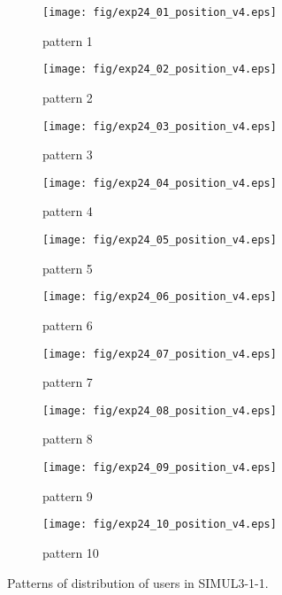 \begin{figure}
	\begin{center}
		\begin{subfigure}[b]{0.32\textwidth}
			\texttt{[image: fig/exp24\_01\_position\_v4.eps]}
			\caption{pattern 1}
			\label{figure:simul3_1_1_a}
		\end{subfigure}
		\begin{subfigure}[b]{0.32\textwidth}
			\texttt{[image: fig/exp24\_02\_position\_v4.eps]}
			\caption{pattern 2}
			\label{figure:simul3_1_1_b}
		\end{subfigure}
		\begin{subfigure}[b]{0.32\textwidth}
			\texttt{[image: fig/exp24\_03\_position\_v4.eps]}
			\caption{pattern 3}
			\label{figure:simul3_1_1_c}
		\end{subfigure}
		\begin{subfigure}[b]{0.32\textwidth}
			\texttt{[image: fig/exp24\_04\_position\_v4.eps]}
			\caption{pattern 4}
			\label{figure:simul3_1_1_d}
		\end{subfigure}
		\begin{subfigure}[b]{0.32\textwidth}
			\texttt{[image: fig/exp24\_05\_position\_v4.eps]}
			\caption{pattern 5}
			\label{figure:simul3_1_1_e}
		\end{subfigure}
		\begin{subfigure}[b]{0.32\textwidth}
			\texttt{[image: fig/exp24\_06\_position\_v4.eps]}
			\caption{pattern 6}
			\label{figure:simul3_1_1_f}
		\end{subfigure}
		\begin{subfigure}[b]{0.32\textwidth}
			\texttt{[image: fig/exp24\_07\_position\_v4.eps]}
			\caption{pattern 7}
			\label{figure:simul3_1_1_g}
		\end{subfigure}
		\begin{subfigure}[b]{0.32\textwidth}
			\texttt{[image: fig/exp24\_08\_position\_v4.eps]}
			\caption{pattern 8}
			\label{figure:simul3_1_1_h}
		\end{subfigure}
		\begin{subfigure}[b]{0.32\textwidth}
			\texttt{[image: fig/exp24\_09\_position\_v4.eps]}
			\caption{pattern 9}
			\label{figure:simul3_1_1_i}
		\end{subfigure}
		\begin{subfigure}[b]{0.32\textwidth}
			\texttt{[image: fig/exp24\_10\_position\_v4.eps]}
			\caption{pattern 10}
			\label{figure:simul3_1_1_j}
		\end{subfigure}
		\caption{Patterns of distribution of users in SIMUL3-1-1.}
		\label{figure:simul3_1_1_p}
	\end{center}
\end{figure}


